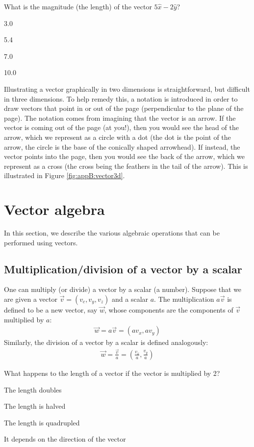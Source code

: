 \begin{checkpointMC}{What is the magnitude (the length) of the vector $5\hat x-2\hat y$?}
\item 3.0
\item 5.4%
\item 7.0
\item 10.0
\end{checkpointMC}

Illustrating a vector graphically in two dimensions is straightforward, but difficult in three dimensions. To help remedy this, a notation is introduced in order to draw vectors that point in or out of the page (perpendicular to the plane of the page). The notation comes from imagining that the vector is an arrow. If the vector is coming out of the page (at you!), then you would see the head of the arrow, which we represent as a circle with a dot (the dot is the point of the arrow, the circle is the base of the conically shaped arrowhead). If instead, the vector points into the page, then you would see the back of the arrow, which we represent as a cross (the cross being the feathers in the tail of the arrow). This is illustrated in Figure \ref{fig:appB:vector3d}.



\section{Vector algebra}
In this section, we describe the various algebraic operations that can be performed using vectors. 
\subsection{Multiplication/division of a vector by a scalar}
One can multiply (or divide) a vector by a scalar (a number). Suppose that we are given a vector $\vec v=(v_c, v_y, v_z)$ and a scalar $a$. The multiplication $a\vec v$ is defined to be a new vector, say $\vec w$, whose components are the components of $\vec v$ multiplied by $a$:
\begin{align*}
\vec w = a\vec v = (av_x, a v_y)
\end{align*}
Similarly, the division of a vector by a scalar is defined analogously:
\begin{align*}
\vec w = \frac{\vec v}{a} = \left(\frac{v_x}{a}, \frac{v_y}{a}\right)
\end{align*}
\begin{checkpointMC}{What happens to the length of a vector if the vector is multiplied by 2?}
\item The length doubles%
\item The length is halved
\item The length is quadrupled
\item It depends on the direction of the vector
\end{checkpointMC}

